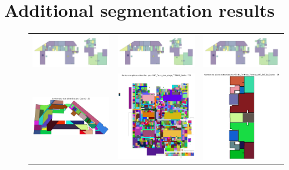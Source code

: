 \documentclass[11pt]{article}
\begin{document}
\section{Additional segmentation results}

\begin{figure}[h]
    \centering
    \begin{tabular}{ccc}
        \includegraphics[width=0.3\linewidth]{figures/simplemodel.png} &
        \includegraphics[width=0.3\linewidth]{figures/simplemodel.png} &
        \includegraphics[width=0.3\linewidth]{figures/simplemodel.png} \\
        \includegraphics[width=0.3\linewidth]{figures/CVSeg_pred-3.png} &
        \includegraphics[width=0.3\linewidth]{figures/CVSeg_pred-2.png} &
        \includegraphics[width=0.3\linewidth]{figures/CVSeg_pred-1.png} \\

\end{tabular}
\end{figure}
\end{document}

